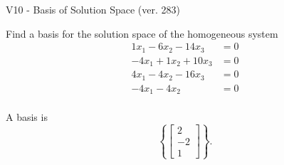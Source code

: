 \begin{exercise}
  \begin{exerciseTitle}V10 - Basis of Solution Space (ver. 283)\end{exerciseTitle}
  \begin{exerciseStatement}
    Find a basis for the solution space of the homogeneous system 
\begin{align*}
 1 x_ 1 -6 x_ 2 -14 x_ 3 &= 0  \\ 
  -4 x_ 1 + 1 x_ 2 + 10 x_ 3 &= 0  \\ 
  4 x_ 1 -4 x_ 2 -16 x_ 3 &= 0  \\ 
  -4 x_ 1 -4 x_ 2 &= 0  \\ 
 \end{align*}


 
  \end{exerciseStatement}

  \begin{exerciseAnswer}
   A basis is   
\[\left\{\left[\begin{array}{c}
2 \\
-2 \\
1
\end{array}\right]\right\}.\]

  


  \end{exerciseAnswer}
\end{exercise}